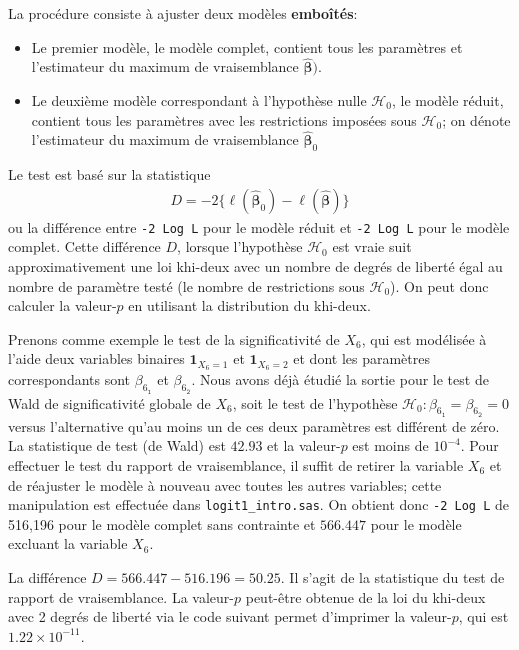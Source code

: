 \documentclass[
  11pt,
  letterpaper,
]{book}
\providecommand{\tightlist}{%
  \setlength{\itemsep}{0pt}\setlength{\parskip}{0pt}}
\theoremstyle{definition}
\theoremstyle{definition}
\theoremstyle{definition}
\theoremstyle{definition}
\theoremstyle{remark}
\begin{document}
La procédure consiste à ajuster deux modèles \textbf{emboîtés}:

\begin{itemize}
\tightlist
\item
  Le premier modèle, le modèle complet, contient tous les paramètres et l'estimateur du maximum de vraisemblance \(\widehat{\boldsymbol{\beta}})\).
\item
  Le deuxième modèle correspondant à l'hypothèse nulle \(\mathcal{H}_0\), le modèle réduit, contient tous les paramètres avec les restrictions imposées sous \(\mathcal{H}_0\); on dénote l'estimateur du maximum de vraisemblance \(\widehat{\boldsymbol{\beta}}_0\)
\end{itemize}

Le test est basé sur la statistique
\begin{align*}
 D = -2\{\ell(\widehat{\boldsymbol{\beta}}_0)-\ell(\widehat{\boldsymbol{\beta}})\}
\end{align*}
ou la différence entre \texttt{-2\ Log\ L} pour le modèle réduit et \texttt{-2\ Log\ L} pour le modèle complet. Cette différence \(D\), lorsque l'hypothèse \(\mathcal{H}_0\) est vraie suit approximativement une loi khi-deux avec un nombre de degrés de liberté égal au nombre de paramètre testé (le nombre de restrictions sous \(\mathcal{H}_0\)). On peut donc calculer la valeur-\(p\) en utilisant la distribution du khi-deux.

Prenons comme exemple le test de la significativité de \(X_6\), qui est modélisée à l'aide deux variables binaires \({\mathbf 1}_{X_6=1}\) et \({\mathbf 1}_{X_6=2}\) et dont les paramètres correspondants sont \(\beta_{6_{\texttt{1}}}\) et \(\beta_{6_{\texttt{2}}}\). Nous avons déjà étudié la sortie pour le test de Wald de significativité globale de \(X_6\), soit le test de l'hypothèse \(\mathcal{H}_0: \beta_{6_{\texttt{1}}}=\beta_{6_{\texttt{2}}}=0\) versus l'alternative qu'au moins un de ces deux paramètres est différent de zéro. La statistique de test (de Wald) est \(42.93\) et la valeur-\(p\) est moins de \(10^{-4}\). Pour effectuer le test du rapport de vraisemblance, il suffit de retirer la variable \(X_6\) et de réajuster le modèle à nouveau avec toutes les autres variables; cette manipulation est effectuée dans \texttt{logit1\_intro.sas}. On obtient donc
\texttt{-2\ Log\ L} de 516,196 pour le modèle complet sans contrainte et \(566.447\) pour le modèle excluant la variable \(X_6\).

La différence \(D = 566.447 - 516.196 = 50.25\). Il s'agit de la statistique du test de rapport de vraisemblance. La valeur-\(p\) peut-être obtenue de la loi du khi-deux avec 2 degrés de liberté via le code suivant permet d'imprimer la valeur-\(p\), qui est \(1.22 \times 10^{-11}\).
\end{document}
